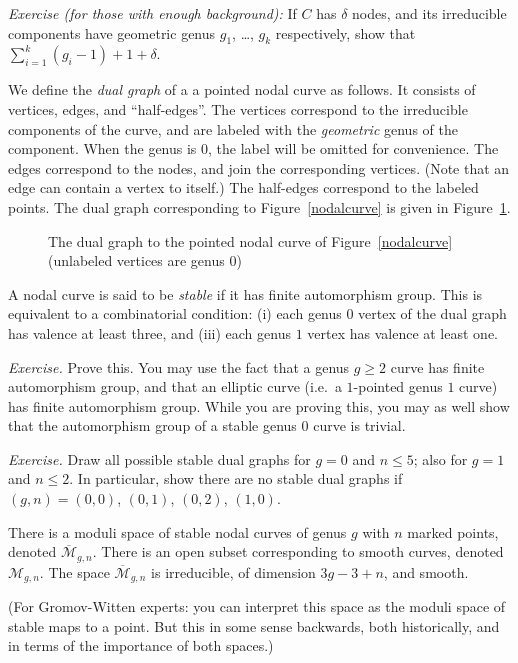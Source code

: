\documentclass[12pt,letterpaper]{amsart}
\newcommand{\epoint}[1]{\vspace{3mm}\par \noindent \refstepcounter{subsection}{\bf \thesubsection.} 
  {\em #1.} }
\newcommand{\cm}{{\mathcal{M}}}
\newcommand{\cmbar}{\overline{\cm}}
\newcommand{\de}{\delta}
\newcommand{\lremind}[1]{{\bf[label:  #1]}}
\renewcommand{\lremind}[1]{{}}
\begin{document}
{\noindent 
{\em Exercise (for those with enough background):}
If $C$ has $\de$ nodes, and its irreducible components
have geometric genus $g_1$, \dots, $g_k$ respectively, 
show that $\sum_{i=1}^k (g_i-1) + 1 + \de$.

We define the {\em dual graph} of a a pointed nodal curve as follows.
It consists of vertices, edges, and ``half-edges''.  The vertices
correspond to the irreducible components of the curve, and are labeled
with the {\em geometric}  genus of the component.  When the genus is $0$, 
the label will be
omitted for convenience.  The edges correspond to the nodes, and join
the corresponding vertices.  (Note that an edge can contain a vertex
to itself.)  The half-edges correspond to the labeled points.  The
dual graph corresponding to Figure~\ref{nodalcurve} is given in
Figure~\ref{dualexample}.

\begin{figure}
\begin{center}

\end{center}
\caption{The dual graph to the pointed nodal curve of Figure~\ref{nodalcurve}
(unlabeled vertices are genus $0$)}
\label{dualexample}
\end{figure}

A nodal curve is said to be {\em stable} if it has finite automorphism
group.  This is equivalent to a combinatorial condition: (i) each
genus $0$ vertex of the dual graph has valence at least three, and
(iii) each genus $1$ vertex has valence at least one.  

\noindent 
{\em Exercise.}
Prove this.  You may use the fact that a genus $g \geq 2$ curve has
finite automorphism group, and that an elliptic curve (i.e.\ a $1$-pointed
genus $1$ curve) has finite automorphism group.  While you are proving
this, you may as well show that the automorphism group of a stable
genus $0$ curve is trivial.

\epoint{Exercise} Draw\label{m05}\lremind{m05} all possible stable
dual graphs for $g=0$ and $n \leq 5$; also for $g=1$ and $n \leq 2$.
In particular, show there are no stable dual graphs if $(g,n) =
(0,0)$, $(0,1)$, $(0,2)$, $(1,0)$.

  There is a moduli space
of stable nodal curves of genus $g$ with $n$ marked points, denoted 
$\cmbar_{g,n}$.  There is an open subset
corresponding to smooth curves, denoted $\cm_{g,n}$.
The space $\cmbar_{g,n}$ is irreducible, of dimension $3g-3+n$,
and smooth.

(For Gromov-Witten experts:  you can interpret this space
as the moduli space of stable maps to a point.  But this in some sense
backwards, both historically, and in terms of the importance of both spaces.)


}
\end{document}

